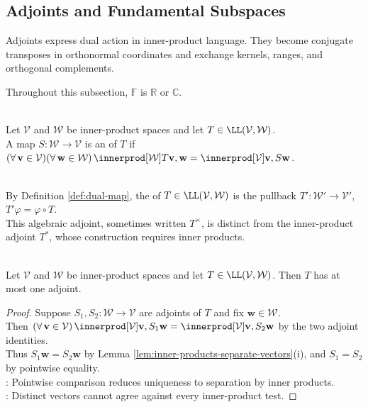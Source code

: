 \subsection{Adjoints and Fundamental Subspaces}


%

Adjoints express dual action in inner-product language. They become conjugate transposes in orthonormal coordinates and exchange kernels, ranges, and orthogonal complements.

Throughout this subsection, $\mathbb{F}$ is $\mathbb{R}$ or $\mathbb{C}$.

\begin{definition} \label{def:adjoint-linear-map} \\
Let $\mathcal{V}$ and $\mathcal{W}$ be inner-product spaces and let $T\in\LL(\mathcal{V},\mathcal{W})$.\\
A map $S:\mathcal{W}\to\mathcal{V}$ is an  of $T$ if $(\forall\,\mathbf{v}\in\mathcal{V})(\forall\,\mathbf{w}\in\mathcal{W})\,\innerprod[\mathcal{W}]{T\mathbf{v},\mathbf{w}}=\innerprod[\mathcal{V}]{\mathbf{v},S\mathbf{w}}$.
\end{definition}

\begin{perspective} \label{per:dual-map-versus-inner-product-adjoint} \\
By Definition \ref{def:dual-map}, the  of $T\in\LL(\mathcal{V},\mathcal{W})$ is the pullback $T':\mathcal{W}'\to\mathcal{V}'$, $T'\varphi=\varphi\circ T$.\\
This algebraic adjoint, sometimes written $T^\times$, is distinct from the inner-product adjoint $T^*$, whose construction requires inner products.
\end{perspective}

\begin{lemma} \label{lem:adjoint-unique-if-exists} \\
Let $\mathcal{V}$ and $\mathcal{W}$ be inner-product spaces and let $T\in\LL(\mathcal{V},\mathcal{W})$. Then $T$ has at most one adjoint.
\begin{proof}
Suppose $S_1,S_2:\mathcal{W}\to\mathcal{V}$ are adjoints of $T$ and fix $\mathbf{w}\in\mathcal{W}$.\\
Then $(\forall\,\mathbf{v}\in\mathcal{V})\,\innerprod[\mathcal{V}]{\mathbf{v},S_1\mathbf{w}}=\innerprod[\mathcal{V}]{\mathbf{v},S_2\mathbf{w}}$ by the two adjoint identities.\\
Thus $S_1\mathbf{w}=S_2\mathbf{w}$ by Lemma \ref{lem:inner-products-separate-vectors}(i), and $S_1=S_2$ by pointwise equality.\\
: Pointwise comparison reduces uniqueness to separation by inner products.\\
: Distinct vectors cannot agree against every inner-product test.
\end{proof}
\end{lemma}

